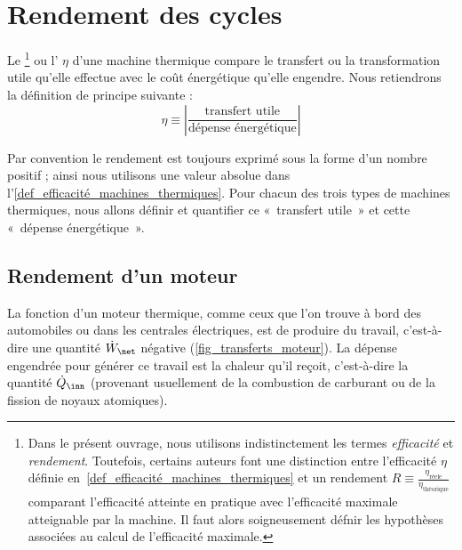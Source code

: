 \section{Rendement des cycles}

	Le \footnote{Dans le présent ouvrage, nous utilisons indistinctement les termes \textit{efficacité} et \textit{rendement}. Toutefois, certains auteurs font une distinction entre l’efficacité $\eta$ définie en~\ref{def_efficacité_machines_thermiques} et un rendement $R \equiv \frac{\eta_\text{réele}}{\eta_\text{théorique}}$ comparant l’efficacité atteinte en pratique avec l’efficacité maximale atteignable par la machine. Il faut alors soigneusement défnir les hypothèses associées au calcul de l’efficacité maximale.}%
	 ou l’ $\eta$ d’une machine thermique compare le transfert ou la transformation utile qu’elle effectue avec le coût énergétique qu’elle engendre. Nous retiendrons la définition de principe suivante :
	\begin{equation}
		\eta \equiv \left| \frac{\text{transfert utile}}{\text{dépense énergétique}} \right|
		\label{def_efficacité_machines_thermiques}
	\end{equation}

	Par convention le rendement est toujours exprimé sous la forme d’un nombre positif ; ainsi nous utilisons une valeur absolue dans l’\cref{def_efficacité_machines_thermiques}. Pour chacun des trois types de machines thermiques, nous allons définir et quantifier ce «~transfert utile~» et cette «~dépense énergétique~».


	\subsection{Rendement d’un moteur}
	\label{ch_rendement_moteur}

		La fonction d’un moteur thermique, comme ceux que l’on trouve à bord des automobiles ou dans les centrales électriques, est de produire du travail, c’est-à-dire une quantité $\dot W_\net$ négative (\cref{fig_transferts_moteur}). La dépense engendrée pour générer ce travail est la chaleur qu’il reçoit, c’est-à-dire la quantité $\dot Q_\inn$ (provenant usuellement de la combustion de carburant ou de la fission de noyaux atomiques).

